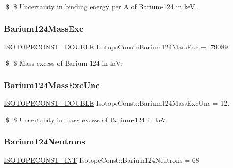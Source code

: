 \$ \$ Uncertainty in binding energy per A of Barium-\/124 in keV. \mbox{\label{group___isotope_const-_barium-_ba124_gafe21c575561f4b30e59171fa3d88d3aa}} 
\subsubsection{\texorpdfstring{Barium124\+Mass\+Exc}{Barium124MassExc}}
{\footnotesize\ttfamily \mbox{\hyperlink{group___isotope_const-_macros_ga8f45a7272ce02c0b4c65c44636ed719a}{I\+S\+O\+T\+O\+P\+E\+C\+O\+N\+S\+T\+\_\+\+D\+O\+U\+B\+LE}} Isotope\+Const\+::\+Barium124\+Mass\+Exc = -\/79089.}

\$ \$ Mass excess of Barium-\/124 in keV. \mbox{\label{group___isotope_const-_barium-_ba124_ga93687578b10896de7e292305ac79a1c2}} 
\subsubsection{\texorpdfstring{Barium124\+Mass\+Exc\+Unc}{Barium124MassExcUnc}}
{\footnotesize\ttfamily \mbox{\hyperlink{group___isotope_const-_macros_ga8f45a7272ce02c0b4c65c44636ed719a}{I\+S\+O\+T\+O\+P\+E\+C\+O\+N\+S\+T\+\_\+\+D\+O\+U\+B\+LE}} Isotope\+Const\+::\+Barium124\+Mass\+Exc\+Unc = 12.}

\$ \$ Uncertainty in mass excess of Barium-\/124 in keV. \mbox{\label{group___isotope_const-_barium-_ba124_ga1b44beba9d3094413554708361569071}} 
\subsubsection{\texorpdfstring{Barium124\+Neutrons}{Barium124Neutrons}}
{\footnotesize\ttfamily \mbox{\hyperlink{group___isotope_const-_macros_ga5f18360b3e99483a35c32d789e62621c}{I\+S\+O\+T\+O\+P\+E\+C\+O\+N\+S\+T\+\_\+\+I\+NT}} Isotope\+Const\+::\+Barium124\+Neutrons = 68}

